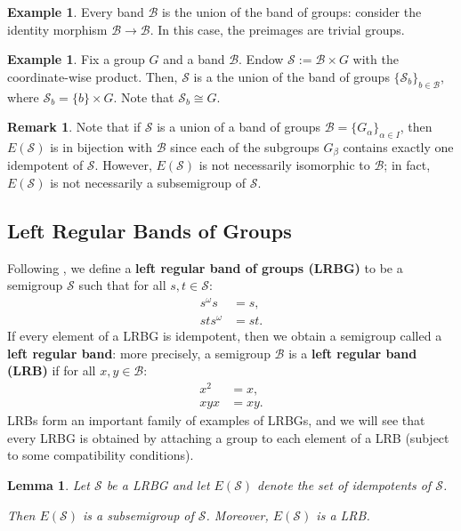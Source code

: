 \documentclass[11pt, oneside, reqno]{amsart}
\newtheorem{lemma}[theorem]{Lemma}
\theoremstyle{definition}
\newtheorem{example}[theorem]{Example}
\newtheorem{remark}[theorem]{Remark}
\numberwithin{equation}{section}
\newcommand{\defn}[1]{{\color{RoyalBlue}\bf#1}}
\def \BB{{\mathcal{B}}}
\def \SS{{\mathcal{S}}}
\begin{document}
\begin{example}
    Every band $\BB$ is the union of the band of groups: consider the identity
    morphism $\BB \xrightarrow{} \BB$. In this case, the preimages are trivial
    groups.
\end{example}

\begin{example}
    Fix a group $G$ and a band $\BB$. Endow $\SS := \BB \times G$ with the
    coordinate-wise product. Then, $\SS$ is a the union of the band of groups
    $\{\SS_b\}_{b \in \BB}$, where $\SS_b = \{b\} \times G$.
    Note that $\SS_b \cong G$.
\end{example}

\begin{remark}
    Note that if $\SS$ is a union of a band of groups
    $\BB = \{G_\alpha\}_{\alpha \in I}$,
    then $E(\SS)$ is in bijection with $\BB$
    since each of the subgroups $G_\beta$ contains exactly one idempotent of
    $\SS$. However, $E(\SS)$ is not necessarily isomorphic to $\BB$;
    in fact, $E(\SS)$ is not necessarily a subsemigroup of $\SS$.
\end{remark}

\subsection{Left Regular Bands of Groups}
\label{appendix:LRBGs}

Following \cite{ms11HomologySemigroups}, we define a
\defn{left regular band of groups (LRBG)} to be a semigroup $\SS$
such that for all $s,t \in \SS$:
\begin{align}
    \tag{LRBG1}     s^\omega s &= s,     \\
    \tag{LRBG2}     s t s^\omega &= s t.
\end{align}
If every element of a LRBG is idempotent, then we obtain a semigroup called
a \defn{left regular band}: more precisely,
a semigroup $\BB$ is a \defn{left regular band (LRB)} if for all $x, y \in
\BB$:
\begin{align}
    \tag{LRB1}  x^2 &= x, \\
    \tag{LRB2}  x y x &= x y.
\end{align}
LRBs form an important family of examples of LRBGs, and we will see that every
LRBG is obtained by attaching a group to each element of a LRB (subject to some
compatibility conditions).

\begin{lemma}
    Let $\SS$ be a LRBG and let $E(\SS)$ denote the set of idempotents of $\SS$.

    Then $E(\SS)$ is a subsemigroup of $\SS$. Moreover, $E(\SS)$ is a LRB.
\end{lemma}
\end{document}

